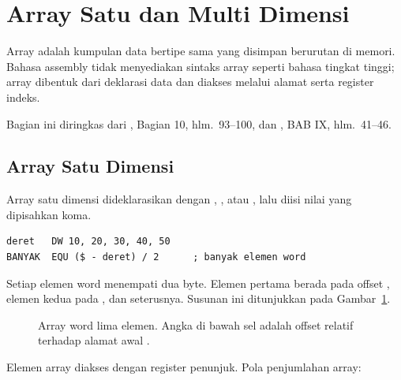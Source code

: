 \section{Array Satu dan Multi Dimensi}
\label{sec:array}

Array adalah kumpulan data bertipe sama yang disimpan berurutan di
memori. Bahasa assembly tidak menyediakan sintaks array seperti bahasa
tingkat tinggi; array dibentuk dari deklarasi data dan diakses melalui
alamat serta register indeks.

Bagian ini diringkas dari \cite{gunawan2019}, Bagian 10,
hlm.~93--100, dan \cite{sto2001}, BAB IX, hlm.~41--46.

\subsection{Array Satu Dimensi}

Array satu dimensi dideklarasikan dengan , , atau
, lalu diisi nilai yang dipisahkan koma.

\begin{lstlisting}[language=MASM, numbers=none]
deret   DW 10, 20, 30, 40, 50
BANYAK  EQU ($ - deret) / 2      ; banyak elemen word
\end{lstlisting}

Setiap elemen word menempati dua byte. Elemen pertama berada pada
offset , elemen kedua pada , dan seterusnya.
Susunan ini ditunjukkan pada Gambar~\ref{fig:array-memori}.

\begin{figure}[H]
    \centering
    \caption{Array word lima elemen. Angka di bawah sel adalah offset
    relatif terhadap alamat awal .}
    \label{fig:array-memori}
\end{figure}

Elemen array diakses dengan register penunjuk. Pola penjumlahan array:

